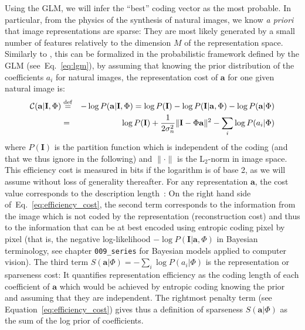 \documentclass[a4paper, 11pt]{book}
\newcommand{\image}{\mathbf{I}} %
\newcommand{\dico}{\Phi} %
\newcommand{\coef}{\mathbf{a}} %
\newcommand{\eqdef}{\stackrel{\rm def}{=}}%
\newcommand{\seeEq}[1]{Eq.~\ref{eq:#1}}%
\begin{document}
Using the GLM, we will infer the ``best'' coding vector as the most probable. In particular, from the physics of the synthesis of natural images, we know \emph{a priori} that image representations are sparse: They are most likely generated by a small number of features relatively to the dimension $M$ of the representation space. %
Similarly to \citet{Lewicki00}, this can be formalized in the probabilistic framework defined by the GLM (see~\seeEq{lgm}), by assuming that knowing the prior distribution of the coefficients $a_i$ for natural images, the representation cost of $\coef$ for one given natural image is:%
\begin{eqnarray}%
\mathcal{C}( \coef | \image , \dico) 	&\eqdef& -\log P( \coef | \image , \dico)
=  \log P( \image )  -\log P( \image | \coef , \dico) -  \log P(\coef | \dico) \nonumber \\
&=& \log P( \image ) + \frac{1}{2\sigma_n^2} \| \image - \dico \coef \|^2 - \sum_i \log P(a_i | \dico)%
\label{eq:efficiency_cost}%
\end{eqnarray}%
where $P( \image )$ is the partition function which is independent of the coding (and that we thus ignore in the following) and $ \| \cdot \|$ is the L$_2$-norm in image space. This efficiency cost is measured in bits if the logarithm is of base 2, as we will assume without loss of generality thereafter. For any representation $\coef$, the cost value corresponds to the description length~\citep{Rissanen78}: On the right hand side of~\seeEq{efficiency_cost}, the second term corresponds to the information from the image which is not coded by the representation (reconstruction cost) and thus to the information that can be at best encoded using entropic coding pixel by pixel (that is, the negative log-likelihood $-\log P( \image | \coef , \dico)$ in Bayesian terminology, see chapter \verb+009_series+ for Bayesian models applied to computer vision). The third term $S( \coef | \dico) = - \sum_i \log P(a_i | \dico)$ is the representation or sparseness cost: It quantifies representation efficiency as the coding length of each coefficient of $\coef$ which would be achieved by entropic coding knowing the prior and assuming that they are independent.
The rightmost penalty term (see Equation~\ref{eq:efficiency_cost}) gives thus a definition of sparseness $S( \coef | \dico)$ as the sum of the log prior of coefficients.
\end{document}
